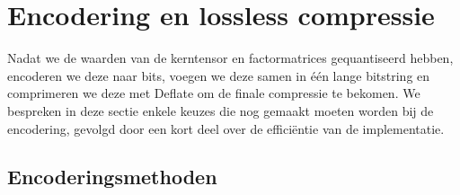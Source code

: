 \section{Encodering en lossless compressie}
\label{sec:encodering}

Nadat we de waarden van de kerntensor en factormatrices gequantiseerd hebben, encoderen we deze naar bits, voegen we deze samen in \'e\'en lange bitstring en comprimeren we deze met Deflate om de finale compressie te bekomen. We bespreken in deze sectie enkele keuzes die nog gemaakt moeten worden bij de encodering, gevolgd door een kort deel over de effici\"entie van de implementatie.

\subsection{Encoderingsmethoden}

